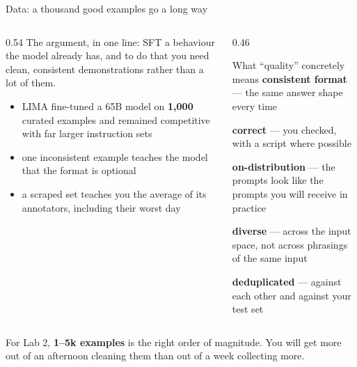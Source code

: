 \documentclass[aspectratio=169,10pt]{beamer}
\begin{document}
\begin{frame}[shrink=4]{Data: a thousand good examples go a long way}
  \begin{columns}[T]
    \begin{column}{0.54\textwidth}
      The argument, in one line: SFT  a behaviour the model
      already has, and to do that you need clean, consistent demonstrations
      rather than a lot of them.
      \vspace{0.5em}
      \begin{itemize}
        \item LIMA fine-tuned a 65B model on \textbf{1{,}000} curated
          examples and remained competitive with far larger instruction sets
        \item one inconsistent example teaches the model that the format is
          optional
        \item a scraped set teaches you the average of its annotators,
          including their worst day
      \end{itemize}
    \end{column}
    \begin{column}{0.46\textwidth}
      \begin{block}{What ``quality'' concretely means}
        \small
        \textbf{consistent format} --- the same answer shape every time

        \textbf{correct} --- you checked, with a script where possible

        \textbf{on-distribution} --- the prompts look like the prompts you will
        receive in practice

        \textbf{diverse} --- across the input space, not across phrasings of
        the same input

        \textbf{deduplicated} --- against each other and against your test set
      \end{block}
    \end{column}
  \end{columns}
  \vspace{0.4em}
  \raggedright
  \small
  For Lab 2, \textbf{1--5k examples} is the right order of magnitude. You will
  get more out of an afternoon cleaning them than out of a week collecting
  more.
\end{frame}
\end{document}
